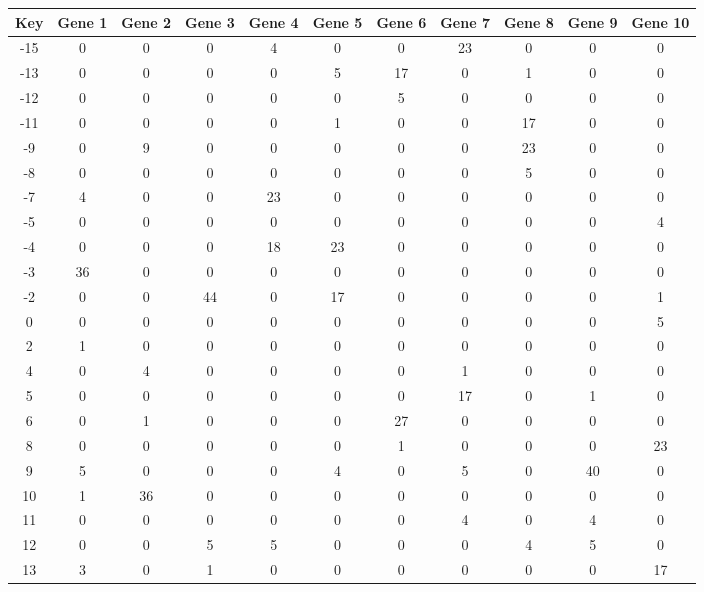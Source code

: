 \begin{tabular}{|c|c|c|c|c|c|c|c|c|c|c|}
\hline
Key & Gene 1 & Gene 2 & Gene 3 & Gene 4 & Gene 5 & Gene 6 & Gene 7 & Gene 8 & Gene 9 & Gene 10 \\
\hline
-15 & 0 & 0 & 0 & 4 & 0 & 0 & 23 & 0 & 0 & 0 \\
-13 & 0 & 0 & 0 & 0 & 5 & 17 & 0 & 1 & 0 & 0 \\
-12 & 0 & 0 & 0 & 0 & 0 & 5 & 0 & 0 & 0 & 0 \\
-11 & 0 & 0 & 0 & 0 & 1 & 0 & 0 & 17 & 0 & 0 \\
-9 & 0 & 9 & 0 & 0 & 0 & 0 & 0 & 23 & 0 & 0 \\
-8 & 0 & 0 & 0 & 0 & 0 & 0 & 0 & 5 & 0 & 0 \\
-7 & 4 & 0 & 0 & 23 & 0 & 0 & 0 & 0 & 0 & 0 \\
-5 & 0 & 0 & 0 & 0 & 0 & 0 & 0 & 0 & 0 & 4 \\
-4 & 0 & 0 & 0 & 18 & 23 & 0 & 0 & 0 & 0 & 0 \\
-3 & 36 & 0 & 0 & 0 & 0 & 0 & 0 & 0 & 0 & 0 \\
-2 & 0 & 0 & 44 & 0 & 17 & 0 & 0 & 0 & 0 & 1 \\
0 & 0 & 0 & 0 & 0 & 0 & 0 & 0 & 0 & 0 & 5 \\
2 & 1 & 0 & 0 & 0 & 0 & 0 & 0 & 0 & 0 & 0 \\
4 & 0 & 4 & 0 & 0 & 0 & 0 & 1 & 0 & 0 & 0 \\
5 & 0 & 0 & 0 & 0 & 0 & 0 & 17 & 0 & 1 & 0 \\
6 & 0 & 1 & 0 & 0 & 0 & 27 & 0 & 0 & 0 & 0 \\
8 & 0 & 0 & 0 & 0 & 0 & 1 & 0 & 0 & 0 & 23 \\
9 & 5 & 0 & 0 & 0 & 4 & 0 & 5 & 0 & 40 & 0 \\
10 & 1 & 36 & 0 & 0 & 0 & 0 & 0 & 0 & 0 & 0 \\
11 & 0 & 0 & 0 & 0 & 0 & 0 & 4 & 0 & 4 & 0 \\
12 & 0 & 0 & 5 & 5 & 0 & 0 & 0 & 4 & 5 & 0 \\
13 & 3 & 0 & 1 & 0 & 0 & 0 & 0 & 0 & 0 & 17 \\
\hline
\end{tabular}